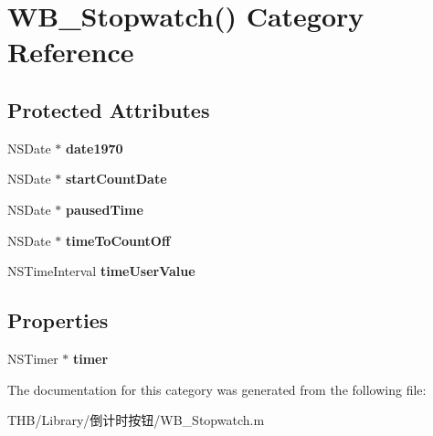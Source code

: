 \hypertarget{category_w_b___stopwatch_07_08}{}\section{W\+B\+\_\+\+Stopwatch() Category Reference}
\label{category_w_b___stopwatch_07_08}
\subsection*{Protected Attributes}
\begin{DoxyCompactItemize}
\item 
\mbox{\label{category_w_b___stopwatch_07_08_a44a21c1112f7f9c2e216fe115f211534}} 
N\+S\+Date $\ast$ {\bfseries date1970}
\item 
\mbox{\label{category_w_b___stopwatch_07_08_afc9313c8e2f6db0b405fce358fc2e488}} 
N\+S\+Date $\ast$ {\bfseries start\+Count\+Date}
\item 
\mbox{\label{category_w_b___stopwatch_07_08_a0d85635af6517af6d7d1ee8a8942bbf8}} 
N\+S\+Date $\ast$ {\bfseries paused\+Time}
\item 
\mbox{\label{category_w_b___stopwatch_07_08_adb195958ac3cece098575f6191f2940b}} 
N\+S\+Date $\ast$ {\bfseries time\+To\+Count\+Off}
\item 
\mbox{\label{category_w_b___stopwatch_07_08_a23b65cc651f44b4a971beb290f509789}} 
N\+S\+Time\+Interval {\bfseries time\+User\+Value}
\end{DoxyCompactItemize}
\subsection*{Properties}
\begin{DoxyCompactItemize}
\item 
\mbox{\label{category_w_b___stopwatch_07_08_a6e91cf12fa4fadabcc4282fd256201fd}} 
N\+S\+Timer $\ast$ {\bfseries timer}
\end{DoxyCompactItemize}


The documentation for this category was generated from the following file\+:\begin{DoxyCompactItemize}
\item 
T\+H\+B/\+Library/倒计时按钮/W\+B\+\_\+\+Stopwatch.\+m\end{DoxyCompactItemize}
